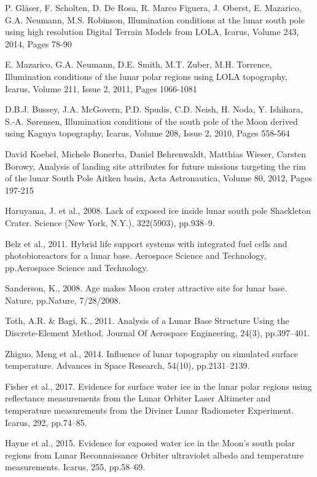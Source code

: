 \documentclass[prl,onecolumn]{revtex4-1}  %
\begin{document}
\begin{thebibliography}{99}
P. Gl{\"a}ser, F. Scholten, D. De Rosa, R. Marco Figuera, J. Oberst, E. Mazarico, G.A. Neumann, M.S. Robinson,
Illumination conditions at the lunar south pole using high resolution Digital Terrain Models from LOLA,
Icarus,
Volume 243,
2014,
Pages 78-90


E. Mazarico, G.A. Neumann, D.E. Smith, M.T. Zuber, M.H. Torrence,
Illumination conditions of the lunar polar regions using LOLA topography,
Icarus,
Volume 211, Issue 2,
2011,
Pages 1066-1081


D.B.J. Bussey, J.A. McGovern, P.D. Spudis, C.D. Neish, H. Noda, Y. Ishihara, S.-A. Sørensen,
Illumination conditions of the south pole of the Moon derived using Kaguya topography,
Icarus,
Volume 208, Issue 2,
2010,
Pages 558-564


David Koebel, Michele Bonerba, Daniel Behrenwaldt, Matthias Wieser, Carsten Borowy,
Analysis of landing site attributes for future missions targeting the rim of the lunar South Pole Aitken basin,
Acta Astronautica,
Volume 80,
2012,
Pages 197-215

 Haruyama, J. et al., 2008. Lack of exposed ice inside lunar south pole Shackleton Crater. Science (New York, N.Y.), 322(5903), pp.938–9.


 Belz et al., 2011. Hybrid life support systems with integrated fuel cells and photobioreactors for a lunar base. Aerospace Science and Technology, pp.Aerospace Science and Technology.


 Sanderson, K., 2008. Age makes Moon crater attractive site for lunar base. Nature, pp.Nature, 7/28/2008.

Toth, A.R. \& Bagi, K., 2011. Analysis of a Lunar Base Structure Using the Discrete-Element Method. Journal Of Aerospace Engineering, 24(3), pp.397–401.

Zhiguo, Meng et al., 2014. Influence of lunar topography on simulated surface temperature. Advances in Space Research, 54(10), pp.2131–2139.


Fisher et al., 2017. Evidence for surface water ice in the lunar polar regions using reflectance measurements from the Lunar Orbiter Laser Altimeter and temperature measurements from the Diviner Lunar Radiometer Experiment. Icarus, 292, pp.74–85.


Hayne et al., 2015. Evidence for exposed water ice in the Moon’s south polar regions from Lunar Reconnaissance Orbiter ultraviolet albedo and temperature measurements. Icarus, 255, pp.58–69.


\end{thebibliography}
\end{document}
